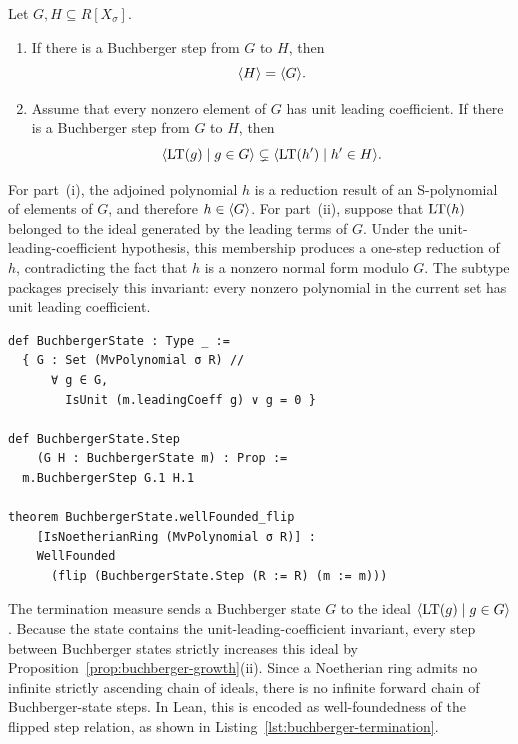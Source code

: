 \begin{proposition}
\label{prop:buchberger-growth}
Let $G,H\subseteq R[X_\sigma]$.
\begin{enumerate}[label=(\roman*),leftmargin=2em]
  \item If there is a Buchberger step from $G$ to $H$, then
  \[
    \langle H \rangle=\langle G \rangle.
  \]
  \item Assume that every nonzero element of $G$ has unit leading
  coefficient.  If there is a Buchberger step from $G$ to $H$, then
  \[
    \langle \operatorname{LT}(g)\mid g\in G \rangle
    \subsetneq
    \langle \operatorname{LT}(h')\mid h'\in H \rangle.
  \]
\end{enumerate}
\end{proposition}

For part~(i), the adjoined polynomial $h$ is a reduction result of an
S-polynomial of elements of $G$, and therefore $h\in\langle G \rangle$.  For
part~(ii), suppose that $\operatorname{LT}(h)$ belonged to the ideal generated by the
leading terms of $G$.  Under the unit-leading-coefficient hypothesis, this
membership produces a one-step reduction of $h$, contradicting the fact that
$h$ is a nonzero normal form modulo $G$.  The subtype
packages precisely this invariant: every nonzero
polynomial in the current set has unit leading coefficient.

\begin{lstlisting}[style=lean,caption={Noetherian termination of the Buchberger step relation.},label={lst:buchberger-termination}]
def BuchbergerState : Type _ :=
  { G : Set (MvPolynomial σ R) //
      ∀ g ∈ G,
        IsUnit (m.leadingCoeff g) ∨ g = 0 }

def BuchbergerState.Step
    (G H : BuchbergerState m) : Prop :=
  m.BuchbergerStep G.1 H.1

theorem BuchbergerState.wellFounded_flip
    [IsNoetherianRing (MvPolynomial σ R)] :
    WellFounded
      (flip (BuchbergerState.Step (R := R) (m := m)))
\end{lstlisting}

The termination measure sends a Buchberger state $G$ to the ideal
$\langle \operatorname{LT}(g)\mid g\in G \rangle$.  Because the state contains the
unit-leading-coefficient invariant, every step between Buchberger states
strictly increases this ideal by Proposition~\ref{prop:buchberger-growth}(ii).
Since a Noetherian ring admits no infinite strictly ascending chain of ideals,
there is no infinite forward chain of Buchberger-state steps.  In Lean, this
is encoded as well-foundedness of the flipped step relation, as shown in
Listing~\ref{lst:buchberger-termination}.

